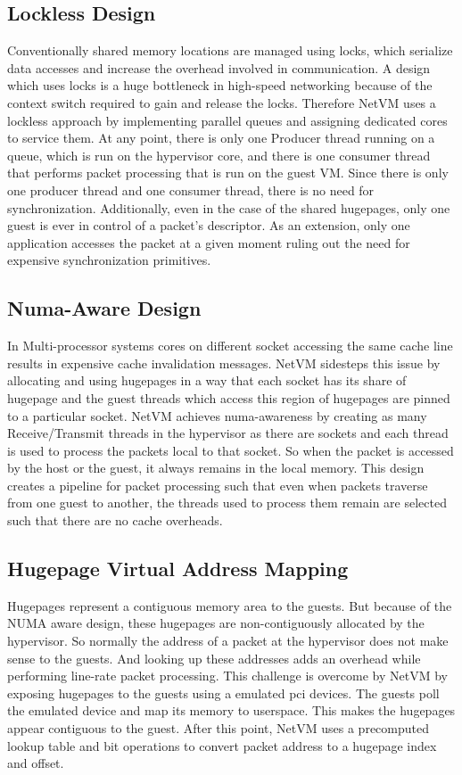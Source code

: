 \subsection*{Lockless Design}
Conventionally shared memory locations are managed using locks, which serialize data accesses and increase the overhead involved in communication. A design which uses locks is a huge bottleneck in high-speed networking because of the context switch required to gain and release the locks. Therefore NetVM uses a lockless approach by implementing parallel queues and assigning dedicated cores to service them. At any point, there is only one Producer thread running on a queue, which is run on the hypervisor core, and there is one consumer thread that performs packet processing that is run on the guest VM. Since there is only one producer thread and one consumer thread, there is no need for synchronization. Additionally, even in the case of the shared hugepages, only one guest is ever in control of a packet's descriptor. As an extension, only one application accesses the packet at a given moment ruling out the need for expensive synchronization primitives.
\subsection*{Numa-Aware Design}
In Multi-processor systems cores on different socket accessing the same cache line results in expensive cache invalidation messages. NetVM sidesteps this issue by allocating and using hugepages in a way that each socket has its share of hugepage and the guest threads which access this region of hugepages are pinned to a particular socket. NetVM achieves \ac{numa}-awareness by creating as many Receive/Transmit threads in the hypervisor as there are sockets and each thread is used to process the packets local to that socket. So when the packet is accessed by the host or the guest, it always remains in the local memory. This design creates a pipeline for packet processing such that even when packets traverse from one guest to another, the threads used to process them remain are selected such that there are no cache overheads.
\subsection*{Hugepage Virtual Address Mapping}
Hugepages represent a contiguous memory area to the guests. But because of the NUMA aware design, these hugepages are non-contiguously allocated by the hypervisor. So normally the address of a packet at the hypervisor does not make sense to the guests. And looking up these addresses adds an overhead while performing line-rate packet processing. This challenge is overcome by NetVM by exposing hugepages to the guests using a emulated \ac{pci} devices. The guests poll the emulated device and map its memory to userspace. This makes the hugepages appear contiguous to the guest. After this point, NetVM uses a precomputed lookup table and bit operations to convert packet address to a hugepage index and offset.
